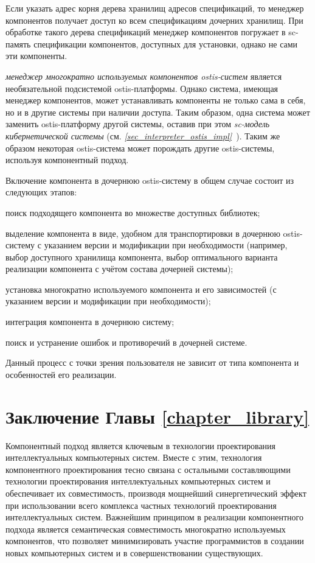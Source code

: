 Если указать адрес корня дерева хранилищ адресов спецификаций, то менеджер компонентов получает доступ ко всем спецификациям дочерних хранилищ. При обработке такого дерева спецификаций менеджер компонентов погружает в sc-память спецификации компонентов, доступных для установки, однако не сами эти компоненты.

\textit{менеджер многократно используемых компонентов ostis-систем} является необязательной подсистемой ostis-платформы. Однако система, имеющая менеджер компонентов, может устанавливать компоненты не только сама в себя, но и в другие системы при наличии доступа. Таким образом, одна система может заменить ostis-платформу другой системы, оставив при этом \textit{sc-модель кибернетической системы} (см. \textit{\ref{sec_interpreter_ostis_impl}~}). Таким же образом некоторая ostis-система может порождать другие ostis-системы, используя компонентный подход.

Включение компонента в дочернюю ostis-систему в общем случае состоит из следующих этапов:
\begin{textitemize}
	\item поиск подходящего компонента во множестве доступных библиотек;
	\item выделение компонента в виде, удобном для транспортировки в дочернюю ostis-систему с указанием версии и модификации при необходимости (например, выбор доступного хранилища компонента, выбор оптимального варианта реализации компонента с учётом состава дочерней системы);
	\item установка многократно используемого компонента и его зависимостей (с указанием версии и модификации при необходимости);
	\item интеграция компонента в дочернюю систему;
	\item поиск и устранение ошибок и противоречий в дочерней системе.
\end{textitemize}

Данный процесс с точки зрения пользователя не зависит от типа компонента и особенностей его реализации.

\section*{Заключение Главы \ref{chapter_library}}
\label{ostis_library_conclusion}

Компонентный подход является ключевым в технологии проектирования интеллектуальных компьютерных систем. Вместе с этим, технология компонентного проектирования тесно связана с остальными составляющими технологии проектирования интеллектуальных компьютерных систем и обеспечивает их совместимость, производя мощнейший синергетический эффект при использовании всего комплекса частных технологий проектирования интеллектуальных систем. Важнейшим принципом в реализации компонентного подхода является семантическая совместимость многократно используемых компонентов, что позволяет минимизировать участие программистов в создании новых компьютерных систем и в совершенствовании существующих.

